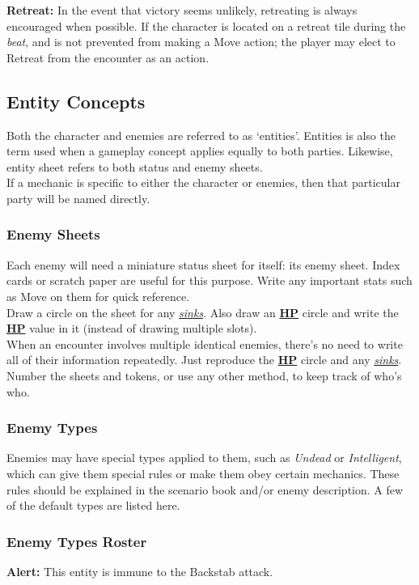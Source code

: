 \documentclass[12pt]{article}
\newcommand{\refto}[1]{\hyperlink{#1}{\textbf{#1}}}
\newcommand{\reftoit}[1]{\hyperlink{#1}{\emph{#1}}}
\begin{document}
\begin{multicols*}{2}
\textbf{Retreat:} In the event that victory seems unlikely, retreating is always encouraged when possible. If the character is located on a retreat tile during the \emph{beat}, and is not prevented from making a Move action; the player may elect to Retreat from the encounter as an action.

\vfill
\pagebreak

\subsection{Entity Concepts}
Both the character and enemies are referred to as ‘entities’. Entities is also the term used when a gameplay concept applies equally to both parties. Likewise, entity sheet refers to both status and enemy sheets.\\
If a mechanic is specific to either the character or enemies, then that particular party will be named directly.

\subsubsection{Enemy Sheets}
Each enemy will need a miniature status sheet for itself: its enemy sheet. Index cards or scratch paper are useful for this purpose. Write any important stats such as Move on them for quick reference.\\
Draw a circle on the sheet for any \reftoit{sinks}. Also draw an \refto{HP} circle and write the \refto{HP} value in it (instead of drawing multiple slots). \\
When an encounter involves multiple identical enemies, there’s no need to write all of their information repeatedly. Just reproduce the \refto{HP} circle and any \reftoit{sinks}. Number the sheets and tokens, or use any other method, to keep track of who’s who.

\subsubsection{Enemy Types}
Enemies may have special types applied to them, such as \emph{Undead} or \emph{Intelligent}, which can give them special rules or make them obey certain mechanics. These rules should be explained in the scenario book and/or enemy description. A few of the default types are listed here.

\subsubsection*{Enemy Types Roster}
\textbf{Alert:} This entity is immune to the Backstab attack.\\


\end{multicols*}
\end{document}
